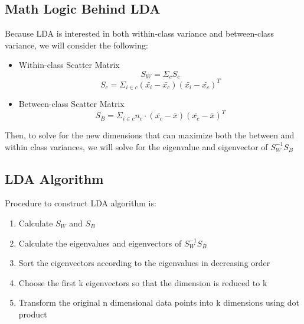 \documentclass[12pt]{article}
\begin{document}
\subsection{Math Logic Behind LDA}
Because LDA is interested in both within-class variance and between-class variance, we will consider the following:
\begin{itemize}
	\item Within-class Scatter Matrix
$$S_W = \Sigma_c S_c$$
$$S_c = \Sigma_{i \in c}(\bar{x_i} - \bar{x_c})(\bar{x_i} - \bar{x_c})^T$$
	\item Between-class Scatter Matrix
$$S_B = \Sigma_{i \in c}n_c\cdot (\bar{x_c} - \bar{x})(\bar{x_c} - \bar{x})^T$$
\end{itemize}
Then, to solve for the new dimensions that can maximize both the between and within class variances, we will solve for the eigenvalue and eigenvector of $S_W^{-1}S_B$

\subsection{LDA Algorithm}
Procedure to construct LDA algorithm is:
\begin{enumerate}
	\item Calculate $S_W$ and $S_B$
	\item Calculate the eigenvalues and eigenvectors of $S_W^{-1}S_B$
	\item Sort the eigenvectors according to the eigenvalues in decreasing order
	\item Choose the first k eigenvectors so that the dimension is reduced to k
	\item Transform the original n dimensional data points into k dimensions using dot product
\end{enumerate}
\end{document}
